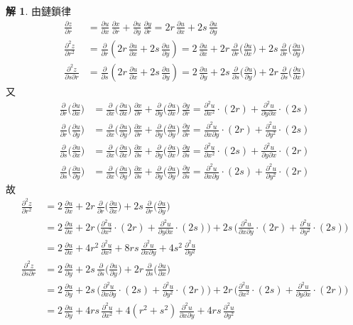 \documentclass[12pt]{extarticle}
\theoremstyle{definition}
\newtheorem*{sol}{解}
\newcommand{\pdiff}[2]{\frac{\partial #1}{\partial #2}}
\newcommand{\pdifft}[2]{\frac{\partial^2 #1}{\partial #2^2}}
\begin{document}
\begin{sol} 由鏈鎖律
  \begin{align*}
    \pdiff{z}{r} &= \pdiff{u}{x}\,\pdiff{x}{r} + \pdiff{u}{y}\,\pdiff{y}{r} = 2r\,\pdiff{u}{x} + 2s\,\pdiff{u}{y} \\
    \pdifft{z}{r} &= \pdiff{}{r}\left(2r\,\pdiff{u}{x} + 2s\,\pdiff{u}{y}\right) = 2\,\pdiff{u}{x} + 2r\,\pdiff{}{r}\bigg(\pdiff{u}{x}\bigg) + 2s\,\pdiff{}{r}\bigg(\pdiff{u}{y}\bigg) \\ 
    \frac{\partial^2 z}{\partial s\partial r} &= \pdiff{}{s}\left(2r\,\pdiff{u}{x} + 2s\,\pdiff{u}{y}\right) = 2\,\pdiff{u}{y} + 2s\,\pdiff{}{s}\bigg(\pdiff{u}{y}\bigg) + 2r\,\pdiff{}{s}\bigg(\pdiff{u}{x}\bigg) 
  \end{align*}
  又
  \begin{align*}
    \pdiff{}{r}\bigg(\pdiff{u}{x}\bigg) &= \pdiff{}{x}\bigg(\pdiff{u}{x}\bigg)\,\pdiff{x}{r} + \pdiff{}{y}\bigg(\pdiff{u}{x}\bigg)\,\pdiff{y}{r} = \pdifft{u}{x}\cdot(2r) + \frac{\partial^2 u}{\partial y\partial x}\cdot(2s) \\
    \pdiff{}{r}\bigg(\pdiff{u}{y}\bigg) &= \pdiff{}{x}\bigg(\pdiff{u}{y}\bigg)\,\pdiff{x}{r} + \pdiff{}{y}\bigg(\pdiff{u}{y}\bigg)\,\pdiff{y}{r} = \frac{\partial^2 u}{\partial x\partial y}\cdot(2r) + \pdifft{u}{y}\cdot(2s) \\
    \pdiff{}{s}\bigg(\pdiff{u}{x}\bigg) &= \pdiff{}{x}\bigg(\pdiff{u}{x}\bigg)\,\pdiff{x}{s} + \pdiff{}{y}\bigg(\pdiff{u}{x}\bigg)\,\pdiff{y}{s} = \pdifft{u}{x}\cdot(2s) + \frac{\partial^2 u}{\partial y\partial x}\cdot(2r) \\
    \pdiff{}{s}\bigg(\pdiff{u}{y}\bigg) &= \pdiff{}{x}\bigg(\pdiff{u}{y}\bigg)\,\pdiff{x}{s} + \pdiff{}{y}\bigg(\pdiff{u}{y}\bigg)\,\pdiff{y}{s} = \frac{\partial^2 u}{\partial x\partial y}\cdot(2s) + \pdifft{u}{y}\cdot(2r)
  \end{align*}
  故
  \begin{align*}
    \pdifft{z}{r} &= 2\,\pdiff{u}{x} + 2r\,\pdiff{}{r}\bigg(\pdiff{u}{x}\bigg) + 2s\,\pdiff{}{r}\bigg(\pdiff{u}{y}\bigg) \\
    &= 2\,\pdiff{u}{x} + 2r\,\bigg(\pdifft{u}{x}\cdot(2r) + \frac{\partial^2 u}{\partial y\partial x}\cdot(2s)\bigg) + 2s\,\bigg(\frac{\partial^2 u}{\partial x\partial y}\cdot(2r) + \pdifft{u}{y}\cdot(2s)\bigg) \\
    &= 2\,\pdiff{u}{x} + 4r^2\,\pdifft{u}{x} + 8rs\,\frac{\partial^2 u}{\partial x\partial y} + 4s^2\,\pdifft{u}{y} \\
    \frac{\partial^2 z}{\partial s\partial r} &= 2\,\pdiff{u}{y} + 2s\,\pdiff{}{s}\bigg(\pdiff{u}{y}\bigg) + 2r\,\pdiff{}{s}\bigg(\pdiff{u}{x}\bigg) \\
    &= 2\,\pdiff{u}{y} + 2s\,\bigg(\frac{\partial^2 u}{\partial x\partial y}\cdot(2s) + \pdifft{u}{y}\cdot(2r)\bigg) + 2r\,\bigg(\pdifft{u}{x}\cdot(2s) + \frac{\partial^2 u}{\partial y\partial x}\cdot(2r)\bigg) \\
    &= 2\,\pdiff{u}{y} + 4rs\,\pdifft{u}{x} + 4(r^2 + s^2)\,\frac{\partial^2 u}{\partial x\partial y} + 4rs\,\pdifft{u}{y}
  \end{align*}
\end{sol}
\end{document}
